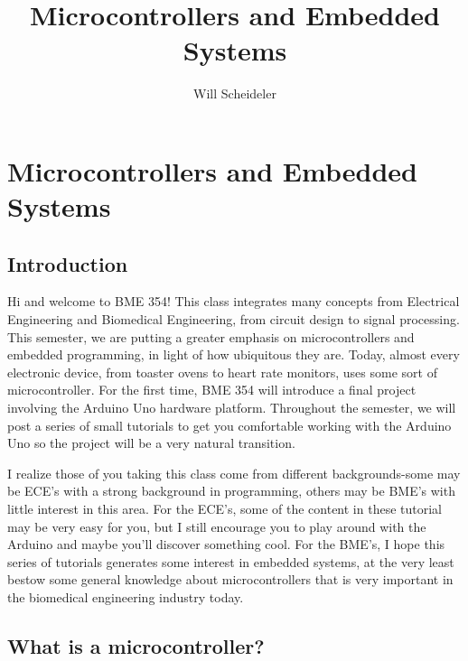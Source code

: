 \documentclass[10pt]{report}
\title{Microcontrollers and Embedded Systems}
\author{Will Scheideler}
\begin{document}
\section*{Microcontrollers and Embedded Systems}

\subsection*{Introduction}
Hi and welcome to BME 354! This class integrates many concepts from Electrical Engineering and Biomedical Engineering, from circuit design to signal processing. This semester, we are putting a greater emphasis on microcontrollers and embedded programming, in light of how ubiquitous they are. Today, almost every electronic device, from toaster ovens to heart rate monitors, uses some sort of microcontroller. For the first time, BME 354 will introduce a final project involving the Arduino Uno hardware platform. Throughout the semester, we will post a series of small tutorials to get you comfortable working with the Arduino Uno so the project will be a very natural transition.
\par
I realize those of you taking this class come from different backgrounds-some may be ECE’s with a strong background in programming, others may be BME’s with little interest in this area. For the ECE’s, some of the content in these tutorial may be very easy for you, but I still encourage you to play around with the Arduino and maybe you’ll discover something cool. For the BME’s, I hope this series of tutorials generates some interest in embedded systems, at the very least bestow some general knowledge about microcontrollers that is very important in the biomedical engineering industry today.

\subsection*{What is a microcontroller?}
\end{document}
